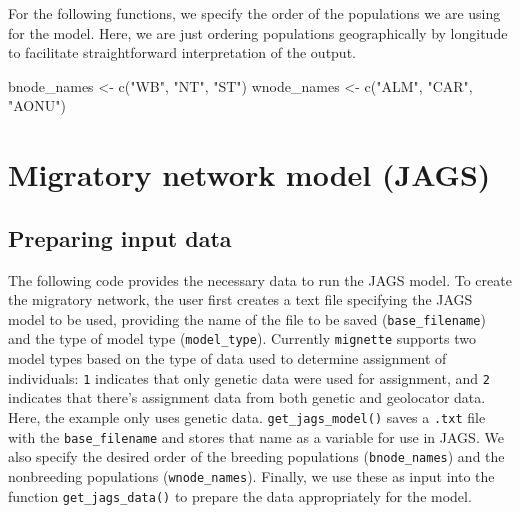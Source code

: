 \documentclass[
]{book}
\newenvironment{Shaded}{\begin{snugshade}}{\end{snugshade}}
\newcommand{\FunctionTok}[1]{\textcolor[rgb]{0.00,0.00,0.00}{#1}}
\newcommand{\NormalTok}[1]{#1}
\newcommand{\OtherTok}[1]{\textcolor[rgb]{0.56,0.35,0.01}{#1}}
\newcommand{\StringTok}[1]{\textcolor[rgb]{0.31,0.60,0.02}{#1}}
\begin{document}
For the following functions, we specify the order of the populations we are using for the model. Here, we are just ordering populations geographically by longitude to facilitate straightforward interpretation of the output.

\begin{Shaded}
\begin{Highlighting}[]
\NormalTok{bnode\_names }\OtherTok{\textless{}{-}} \FunctionTok{c}\NormalTok{(}\StringTok{"WB"}\NormalTok{, }\StringTok{"NT"}\NormalTok{, }\StringTok{"ST"}\NormalTok{)}
\NormalTok{wnode\_names }\OtherTok{\textless{}{-}} \FunctionTok{c}\NormalTok{(}\StringTok{"ALM"}\NormalTok{, }\StringTok{"CAR"}\NormalTok{, }\StringTok{"AONU"}\NormalTok{)}
\end{Highlighting}
\end{Shaded}

\hypertarget{migratory-network-model-jags}{%
\section{Migratory network model (JAGS)}\label{migratory-network-model-jags}}

\hypertarget{preparing-input-data}{%
\subsection{Preparing input data}\label{preparing-input-data}}

The following code provides the necessary data to run the JAGS model. To create the migratory network, the user first creates a text file specifying the JAGS model to be used, providing the name of the file to be saved (\texttt{base\_filename}) and the type of model type (\texttt{model\_type}). Currently \texttt{mignette} supports two model types based on the type of data used to determine assignment of individuals: \texttt{1} indicates that only genetic data were used for assignment, and \texttt{2} indicates that there's assignment data from both genetic and geolocator data. Here, the example only uses genetic data. \texttt{get\_jags\_model()} saves a \texttt{.txt} file with the \texttt{base\_filename} and stores that name as a variable for use in JAGS. We also specify the desired order of the breeding populations (\texttt{bnode\_names}) and the nonbreeding populations (\texttt{wnode\_names}). Finally, we use these as input into the function \texttt{get\_jags\_data()} to prepare the data appropriately for the model.
\end{document}
